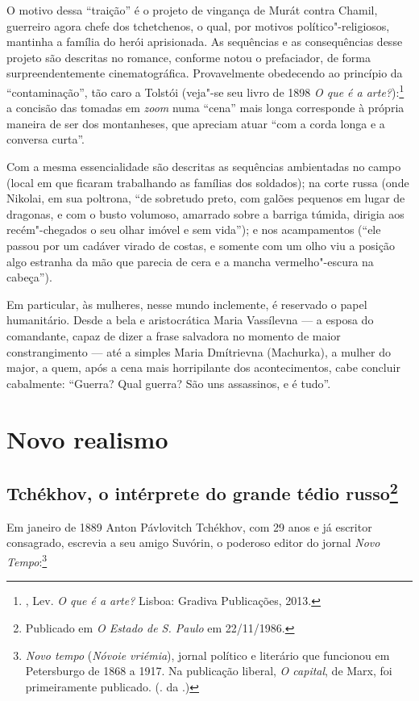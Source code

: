 O motivo dessa ``traição'' é o projeto de vingança de Murát contra Chamil,
guerreiro agora chefe dos tchetchenos, o qual, por motivos
político"-religiosos, mantinha a família do herói aprisionada. As
sequências e as consequências desse projeto são descritas no romance,
conforme notou o prefaciador, de forma surpreendentemente
cinematográfica. Provavelmente obedecendo ao princípio da
``contaminação'', tão caro a Tolstói (veja"-se seu livro de 1898 \emph{O
que é a arte?}):\footnote{, Lev. \emph{O que é a arte?} Lisboa:
  Gradiva Publicações, 2013.} a concisão das tomadas em \emph{zoom}
numa ``cena'' mais longa corresponde à própria maneira de ser dos
montanheses, que apreciam atuar ``com a corda longa e a conversa curta''.

Com a mesma essencialidade são descritas as sequências ambientadas no
campo (local em que ficaram trabalhando as famílias dos soldados); na
corte russa (onde Nikolai, em sua poltrona, ``de sobretudo preto, com
galões pequenos em lugar de dragonas, e com o busto volumoso, amarrado
sobre a barriga túmida, dirigia aos recém"-chegados o seu olhar imóvel e
sem vida''); e nos acampamentos (``ele passou por um cadáver virado de
costas, e somente com um olho viu a posição algo estranha da mão que
parecia de cera e a mancha vermelho"-escura na cabeça'').

Em particular, às mulheres, nesse mundo inclemente, é reservado o papel
humanitário. Desde a bela e aristocrática Maria Vassílevna --- a esposa
do comandante, capaz de dizer a frase salvadora no momento de maior
constrangimento --- até a simples Maria Dmítrievna (Machurka), a mulher
do major, a quem, após a cena mais horripilante dos acontecimentos, cabe
concluir cabalmente: ``Guerra? Qual guerra? São uns assassinos, e é
tudo''.

\part{Novo realismo}

\chapter{Tchékhov, o intérprete do grande tédio russo\footnote{Publicado em \emph{O Estado de S. Paulo} em 22/11/1986.}}
\label{tchekhov}

Em janeiro de 1889 Anton Pávlovitch Tchékhov, com 29 anos e já
escritor consagrado, escrevia a seu amigo Suvórin, o poderoso
editor do jornal \emph{Novo Tempo}:\footnote{\emph{Novo tempo}
(\emph{Nóvoie vriémia}), jornal político e literário que
funcionou em Petersburgo de 1868 a 1917. Na publicação liberal,
\emph{O capital}, de Marx, foi primeiramente publicado.
(. da .)}

